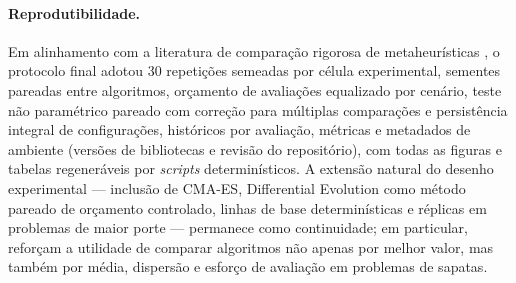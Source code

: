 \paragraph{Reprodutibilidade.}
Em alinhamento com a literatura de comparação rigorosa de metaheurísticas , o protocolo final adotou 30 repetições semeadas por célula experimental, sementes pareadas entre algoritmos, orçamento de avaliações equalizado por cenário, teste não paramétrico pareado com correção para múltiplas comparações e persistência integral de configurações, históricos por avaliação, métricas e metadados de ambiente (versões de bibliotecas e revisão do repositório), com todas as figuras e tabelas regeneráveis por \textit{scripts} determinísticos. A extensão natural do desenho experimental — inclusão de CMA-ES, Differential Evolution como método pareado de orçamento controlado, linhas de base determinísticas e réplicas em problemas de maior porte — permanece como continuidade; em particular,  reforçam a utilidade de comparar algoritmos não apenas por melhor valor, mas também por média, dispersão e esforço de avaliação em problemas de sapatas.
